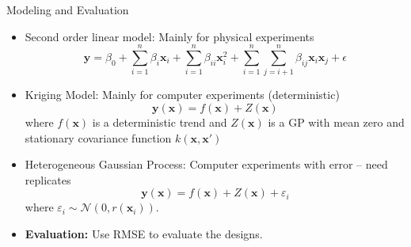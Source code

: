 \documentclass{beamer}
\newcommand{\x}{\boldsymbol{x}}
\newcommand{\y}{\boldsymbol{y}}
\begin{document}
\begin{frame}{Modeling and Evaluation}
 \begin{itemize}
  \item Second order linear model: Mainly for physical experiments\[
\y = \beta_0 + \sum_{i=1}^n \beta_i \x_i + \sum_{i=1}^n \beta_{ii} \x_i^2 + \sum_{i=1}^n \sum_{j=i+1}^n \beta_{ij} \x_i \x_j + \epsilon
\]
  \item Kriging Model: Mainly for computer experiments (deterministic)%
  $$\y(\x) = f(\x) + Z(\x)$$ where  $f(\x)$ is a deterministic trend and $Z(\x)$ is a GP with mean zero and stationary covariance function $k(\x,\x')$
  \item Heterogeneous Gaussian Process: Computer experiments with error -- need replicates
  $$\y(\x) = f(\x) + Z(\x) + \varepsilon_i$$ where $\varepsilon_i\sim \mathcal{N}(0, r(\x_i))$.
   \item \textbf{Evaluation:} Use RMSE to evaluate the designs.
 \end{itemize}
 \end{frame}


\end{document}
